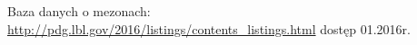 \begin{thebibliography}{9}

  Baza danych o mezonach:\\
  \url{http://pdg.lbl.gov/2016/listings/contents_listings.html}
  dostęp 01.2016r.

\end{thebibliography}

